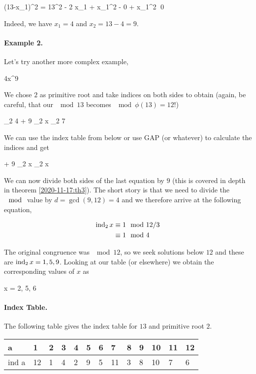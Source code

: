 \bee
(13-x_1)^2 = 13^2 - 2  \cdot x_1 + x_1^2  - 0 + x_1^2   \qed
\eee

Indeed, we have $x_1 = 4$ and $x_2 = 13 - 4 = 9$.


\paragraph{Example 2.} Let's try another more complex example,

\bee
4x^9  
\eee

We chose $2$ as primitive root and take indices on both sides to obtain (again, be careful, that our $\mod 13$ becomes $\mod \phi(13) = 12$!)

\bee
\ind_2 4 + 9 \ind_2 x \equiv \ind_2 7 
\eee

We can use the index table from below or use GAP (or whatever) to calculate the indices and get

 + 9 \ind_2 x    \ind_2 x  
\eee

We can now divide both sides of the last equation by $9$ (this is covered in depth in theorem \ref{2020-11-17:th3}). The short story is that we need to divide the $\mod$ value by $d = \gcd(9, 12) = 4$ and we therefore arrive at the following equation,

\begin{align*}
\operatorname{ind}_2 x & \equiv 1 \mod 12/3 \\
& \equiv 1 \mod 4
\end{align*}


The original congruence was $\mod 12$, so we seek solutions below $12$ and these are $\operatorname{ind}_2 x = 1, 5, 9$. Looking at our table (or elsewhere) we obtain the corresponding values of $x$ as

\bee
x = 2, 5, 6 
\eee

\paragraph{Index Table.} The following table gives the index table for $13$ and primitive root $2$.

\vspace{2mm}

\begin{tabular}{lllllllllllll}
    a     & 1  & 2 & 3 & 4 & 5 & 6 & 7  & 8 & 9 & 10 & 11 & 12 \\ \hline
    ind a & 12 & 1 & 4 & 2 & 9 & 5 & 11 & 3 & 8 & 10 & 7  & 6 
\end{tabular}

